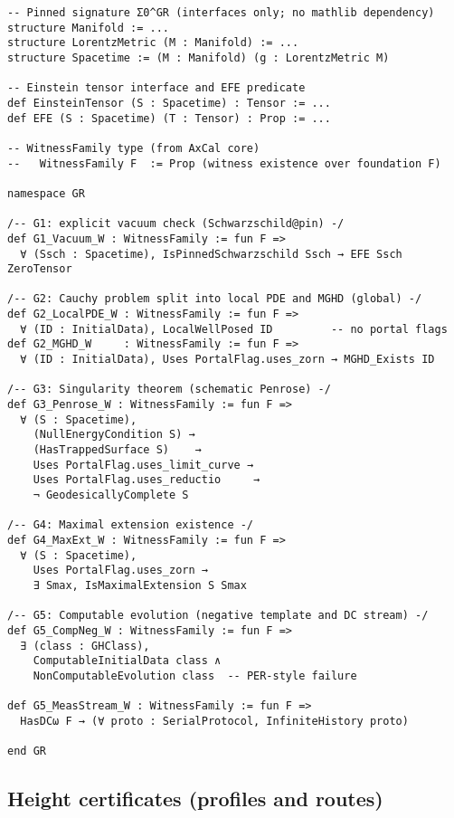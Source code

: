 \documentclass[11pt]{article}
\theoremstyle{definition}
\theoremstyle{remark}
\begin{document}
\begin{verbatim}
-- Pinned signature Σ0^GR (interfaces only; no mathlib dependency)
structure Manifold := ...
structure LorentzMetric (M : Manifold) := ...
structure Spacetime := (M : Manifold) (g : LorentzMetric M)

-- Einstein tensor interface and EFE predicate
def EinsteinTensor (S : Spacetime) : Tensor := ...
def EFE (S : Spacetime) (T : Tensor) : Prop := ...

-- WitnessFamily type (from AxCal core)
--   WitnessFamily F  := Prop (witness existence over foundation F)

namespace GR

/-- G1: explicit vacuum check (Schwarzschild@pin) -/
def G1_Vacuum_W : WitnessFamily := fun F =>
  ∀ (Ssch : Spacetime), IsPinnedSchwarzschild Ssch → EFE Ssch ZeroTensor

/-- G2: Cauchy problem split into local PDE and MGHD (global) -/
def G2_LocalPDE_W : WitnessFamily := fun F =>
  ∀ (ID : InitialData), LocalWellPosed ID         -- no portal flags
def G2_MGHD_W     : WitnessFamily := fun F =>
  ∀ (ID : InitialData), Uses PortalFlag.uses_zorn → MGHD_Exists ID

/-- G3: Singularity theorem (schematic Penrose) -/
def G3_Penrose_W : WitnessFamily := fun F =>
  ∀ (S : Spacetime),
    (NullEnergyCondition S) →
    (HasTrappedSurface S)    →
    Uses PortalFlag.uses_limit_curve →
    Uses PortalFlag.uses_reductio     →
    ¬ GeodesicallyComplete S

/-- G4: Maximal extension existence -/
def G4_MaxExt_W : WitnessFamily := fun F =>
  ∀ (S : Spacetime),
    Uses PortalFlag.uses_zorn →
    ∃ Smax, IsMaximalExtension S Smax

/-- G5: Computable evolution (negative template and DC stream) -/
def G5_CompNeg_W : WitnessFamily := fun F =>
  ∃ (class : GHClass),
    ComputableInitialData class ∧
    NonComputableEvolution class  -- PER-style failure

def G5_MeasStream_W : WitnessFamily := fun F =>
  HasDCω F → (∀ proto : SerialProtocol, InfiniteHistory proto)

end GR
\end{verbatim}

\subsection{Height certificates (profiles and routes)}\label{app:certs}
\end{document}

